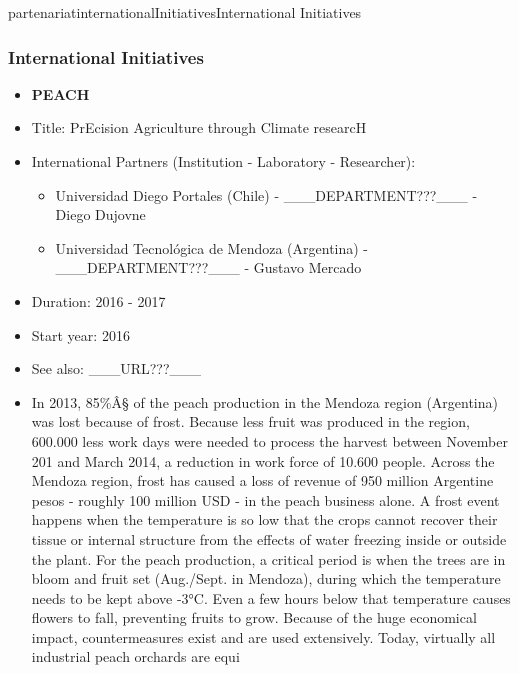 \documentclass{ra2016}
\begin{document}
\begin{module}{partenariat}{internationalInitiatives}{International Initiatives}
\subsubsection{International Initiatives}
\begin{itemize}
 \item \textbf{ PEACH} 
 \item Title: PrEcision Agriculture through Climate researcH
 \item International Partners (Institution -  Laboratory - Researcher):
 \begin{itemize}
    \item Universidad Diego Portales (Chile)  
 - \_\_\_DEPARTMENT???\_\_\_ - Diego Dujovne
    \item Universidad Tecnológica de Mendoza (Argentina)  
 - \_\_\_DEPARTMENT???\_\_\_ - Gustavo Mercado
 \end{itemize}
 \item Duration: 2016 - 2017
 \item Start year: 2016\item See also: \_\_\_URL???\_\_\_
 \item In 2013, 85\%Â§ of the peach production in the Mendoza region (Argentina) was lost because of frost. Because less fruit was produced in the region, 600.000 less work days were needed to process the harvest between November 201 and March 2014, a reduction in work force of 10.600 people. Across the Mendoza region, frost has caused a loss of revenue of 950 million Argentine pesos - roughly 100 million USD - in the peach business alone.
A frost event happens when the temperature is so low that the crops cannot recover their tissue or internal structure from the effects of water freezing inside or outside the plant. For the peach production, a critical period is when the trees are in bloom and fruit set (Aug./Sept. in Mendoza), during which the temperature needs to be kept above -3°C. Even a few hours below that temperature causes flowers to fall, preventing fruits to grow.
Because of the huge economical impact, countermeasures exist and are used extensively.
Today, virtually all industrial peach orchards are equi 
\end{itemize}


\end{module}
\end{document}
